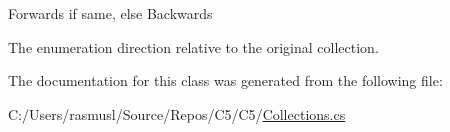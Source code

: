 {\ttfamily Forwards} if same, else {\ttfamily Backwards} 

The enumeration direction relative to the original collection.

The documentation for this class was generated from the following file\+:\begin{DoxyCompactItemize}
\item 
C\+:/\+Users/rasmusl/\+Source/\+Repos/\+C5/\+C5/\hyperlink{_collections_8cs}{Collections.\+cs}\end{DoxyCompactItemize}
